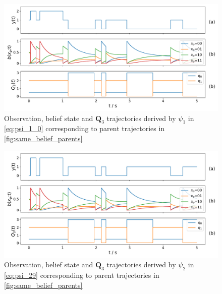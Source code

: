 \begin{figure}[H]
	\begin{center}
		\includegraphics[width=.90\textwidth]{figures/equivalence_classes/same_belief/psi_0}
		\caption{Observation, belief state and $ \textbf{Q}_3 $ trajectories derived by $ \psi_1 $ in \autoref{eq:psi_1_0} corresponding to parent trajectories in \autoref{fig:same_belief_parents}}
		\label{fig:same_belief_psi_0}
	\end{center}
\end{figure}
\begin{figure}[H]
	\begin{center}
		\includegraphics[width=.90\textwidth]{figures/equivalence_classes/same_belief/psi_29}
		\caption{Observation, belief state and $ \textbf{Q}_3 $ trajectories derived by $ \psi_2 $ in \autoref{eq:psi_29} corresponding to parent trajectories in \autoref{fig:same_belief_parents}}
		\label{fig:same_belief_psi_29}
	\end{center}
\end{figure}


